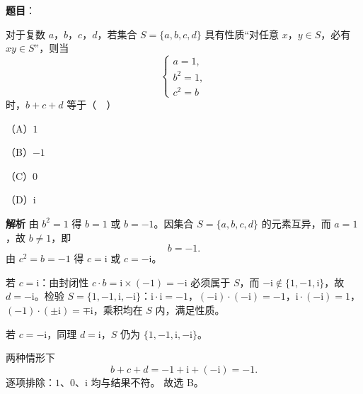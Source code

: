 \begin{answer}

\textbf{题目}：

对于复数 $a$，$b$，$c$，$d$，若集合 $S=\{a,b,c,d\}$ 具有性质“对任意 $x$，$y\in S$，必有 $xy\in S$”，则当
\nopagebreak[4]
\[\begin{cases}a=1,\\b^2=1,\\c^2=b\end{cases}\]
时，$b+c+d$ 等于（　）

（A）$1$

（B）$-1$

（C）$0$

（D）$\mathrm{i}$

\textbf{解析}
由 $b^2=1$ 得 $b=1$ 或 $b=-1$。因集合 $S=\{a,b,c,d\}$ 的元素互异，而 $a=1$，故 $b\neq1$，即
\nopagebreak[4]
\[b=-1.\]
由 $c^2=b=-1$ 得 $c=\mathrm i$ 或 $c=-\mathrm i$。

若 $c=\mathrm i$：由封闭性 $c\cdot b=\mathrm i\times(-1)=-\mathrm i$ 必须属于 $S$，而 $-\mathrm i\notin\{1,-1,\mathrm i\}$，故 $d=-\mathrm i$。检验 $S=\{1,-1,\mathrm i,-\mathrm i\}$：$\mathrm i\cdot\mathrm i=-1$，$(-\mathrm i)\cdot(-\mathrm i)=-1$，$\mathrm i\cdot(-\mathrm i)=1$，$(-1)\cdot(\pm\mathrm i)=\mp\mathrm i$，乘积均在 $S$ 内，满足性质。

若 $c=-\mathrm i$，同理 $d=\mathrm i$，$S$ 仍为 $\{1,-1,\mathrm i,-\mathrm i\}$。

两种情形下
\nopagebreak[4]
\[b+c+d=-1+\mathrm i+(-\mathrm i)=-1.\]
逐项排除：$1$、$0$、$\mathrm i$ 均与结果不符。
故选 B。


\end{answer}
